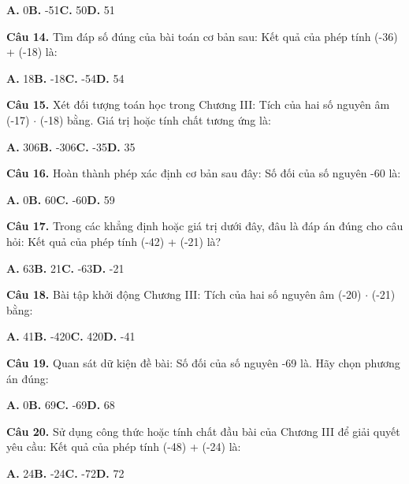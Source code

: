 \documentclass[11pt,a4paper]{article}
\begin{document}
\hspace*{1.5em}\textbf{A.} 0\quad\quad \textbf{B.} -51\quad\quad \textbf{C.} 50\quad\quad \textbf{D.} 51\par\vspace{2pt}
\textbf{\color{primary} Câu 14.} Tìm đáp số đúng của bài toán cơ bản sau: Kết quả của phép tính (-36) + (-18) là:\par
\hspace*{1.5em}\textbf{A.} 18\quad\quad \textbf{B.} -18\quad\quad \textbf{C.} -54\quad\quad \textbf{D.} 54\par\vspace{2pt}
\textbf{\color{primary} Câu 15.} Xét đối tượng toán học trong Chương III: Tích của hai số nguyên âm (-17) $\cdot$ (-18) bằng. Giá trị hoặc tính chất tương ứng là:\par
\hspace*{1.5em}\textbf{A.} 306\quad\quad \textbf{B.} -306\quad\quad \textbf{C.} -35\quad\quad \textbf{D.} 35\par\vspace{2pt}
\textbf{\color{primary} Câu 16.} Hoàn thành phép xác định cơ bản sau đây: Số đối của số nguyên -60 là:\par
\hspace*{1.5em}\textbf{A.} 0\quad\quad \textbf{B.} 60\quad\quad \textbf{C.} -60\quad\quad \textbf{D.} 59\par\vspace{2pt}
\textbf{\color{primary} Câu 17.} Trong các khẳng định hoặc giá trị dưới đây, đâu là đáp án đúng cho câu hỏi: Kết quả của phép tính (-42) + (-21) là?\par
\hspace*{1.5em}\textbf{A.} 63\quad\quad \textbf{B.} 21\quad\quad \textbf{C.} -63\quad\quad \textbf{D.} -21\par\vspace{2pt}
\textbf{\color{primary} Câu 18.} Bài tập khởi động Chương III: Tích của hai số nguyên âm (-20) $\cdot$ (-21) bằng:\par
\hspace*{1.5em}\textbf{A.} 41\quad\quad \textbf{B.} -420\quad\quad \textbf{C.} 420\quad\quad \textbf{D.} -41\par\vspace{2pt}
\textbf{\color{primary} Câu 19.} Quan sát dữ kiện đề bài: Số đối của số nguyên -69 là. Hãy chọn phương án đúng:\par
\hspace*{1.5em}\textbf{A.} 0\quad\quad \textbf{B.} 69\quad\quad \textbf{C.} -69\quad\quad \textbf{D.} 68\par\vspace{2pt}
\textbf{\color{primary} Câu 20.} Sử dụng công thức hoặc tính chất đầu bài của Chương III để giải quyết yêu cầu: Kết quả của phép tính (-48) + (-24) là:\par
\hspace*{1.5em}\textbf{A.} 24\quad\quad \textbf{B.} -24\quad\quad \textbf{C.} -72\quad\quad \textbf{D.} 72\par\vspace{2pt}
\end{document}
